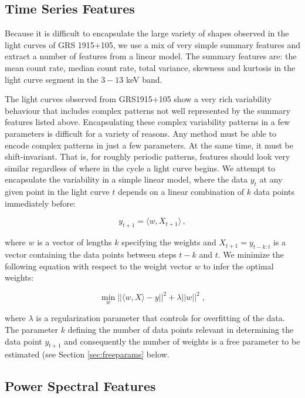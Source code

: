 \documentclass[12pt]{emulateapj}
\begin{document}
\subsection{Time Series Features}

Because it is difficult to encapsulate the large variety of shapes observed in the light curves of GRS 1915+105, we use a mix of very simple summary features and extract a number of features from a linear model. The summary features are: the mean count rate, median count rate, total variance, skewness and kurtosis in the light curve segment in the $3 - 13$ keV band. 

The light curves observed from GRS1915+105 show a very rich variability behaviour that includes complex patterns not well represented by the summary features listed above. Encapsulating these complex variability patterns in a few parameters is difficult for a variety of reasons. Any method must be able to encode complex patterns in just a few parameters. At the same time, it must be shift-invariant. That is, for roughly periodic patterns, features should look very similar regardless of where in the cycle a light curve begins. We attempt to encapsulate the variability in a simple linear model, where the data $y_t$ at any given point in the light curve $t$ depends on a linear combination of $k$ data points immediately before:

\begin{equation}
y_{t+1} = \langle w, X_{t+1} \rangle \, ,
\end{equation}

\noindent  where $w$ is a vector of lengths $k$ specifying the weights and $X_{t+1} = y_{t-k:t}$ is a vector containing the data points between steps $t-k$ and $t$.
We minimize the following equation with respect to the weight vector $w$ to infer the optimal weights:

\begin{equation}
\min_w ||\langle w, X \rangle - y||^2 + \lambda ||w||^2 \; ,
\end{equation}

\noindent where $\lambda$ is a regularization parameter that controls for overfitting of the data. The parameter $k$ defining the number of data points relevant in determining the data point $y_{t+1}$ and consequently the number of weights is a free parameter to be estimated (see Section \ref{sec:freeparams} below.

\subsection{Power Spectral Features}
\end{document}
